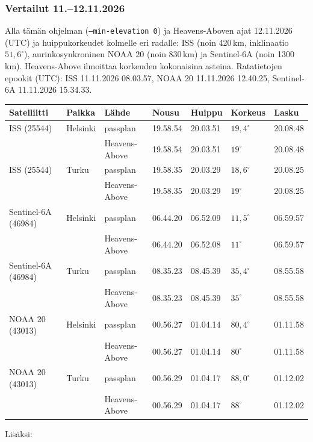 \documentclass[a4paper,11pt]{article}
\newcommand{\koodi}[1]{\texttt{#1}}
\begin{document}
\subsubsection*{Vertailut 11.--12.11.2026}
Alla tämän ohjelman (\koodi{--min-elevation 0}) ja Heavens-Aboven ajat 12.11.2026 (UTC) ja
huippukorkeudet kolmelle eri radalle: ISS (noin 420\,km, inklinaatio $51{,}6^\circ$),
aurinkosynkroninen NOAA 20 (noin 830\,km) ja Sentinel-6A (noin 1300\,km). Heavens-Above
ilmoittaa korkeuden kokonaisina asteina. Ratatietojen epookit (UTC): ISS 11.11.2026 08.03.57,
NOAA 20 11.11.2026 12.40.25, Sentinel-6A 11.11.2026 15.34.33.
\begin{center}
\small
{\renewcommand{\arraystretch}{1.25}
\begin{tabular}{@{}lllllll@{}}
\toprule
Satelliitti & Paikka & Lähde & Nousu & Huippu & Korkeus & Lasku \\
\midrule
ISS (25544) & Helsinki & passplan & 19.58.54 & 20.03.51 & $19{,}4^\circ$ & 20.08.48 \\
 &  & Heavens-Above & 19.58.54 & 20.03.51 & $19^\circ$ & 20.08.48 \\
\addlinespace[4pt]
ISS (25544) & Turku & passplan & 19.58.35 & 20.03.29 & $18{,}6^\circ$ & 20.08.25 \\
 &  & Heavens-Above & 19.58.35 & 20.03.29 & $19^\circ$ & 20.08.25 \\
\addlinespace[4pt]
Sentinel-6A (46984) & Helsinki & passplan & 06.44.20 & 06.52.09 & $11{,}5^\circ$ & 06.59.57 \\
 &  & Heavens-Above & 06.44.20 & 06.52.08 & $11^\circ$ & 06.59.57 \\
\addlinespace[4pt]
Sentinel-6A (46984) & Turku & passplan & 08.35.23 & 08.45.39 & $35{,}4^\circ$ & 08.55.58 \\
 &  & Heavens-Above & 08.35.23 & 08.45.39 & $35^\circ$ & 08.55.58 \\
\addlinespace[4pt]
NOAA 20 (43013) & Helsinki & passplan & 00.56.27 & 01.04.14 & $80{,}4^\circ$ & 01.11.58 \\
 &  & Heavens-Above & 00.56.27 & 01.04.14 & $80^\circ$ & 01.11.58 \\
\addlinespace[4pt]
NOAA 20 (43013) & Turku & passplan & 00.56.29 & 01.04.17 & $88{,}0^\circ$ & 01.12.02 \\
 &  & Heavens-Above & 00.56.29 & 01.04.17 & $88^\circ$ & 01.12.02 \\
\bottomrule
\end{tabular}}
\end{center}
Lisäksi:
\end{document}
